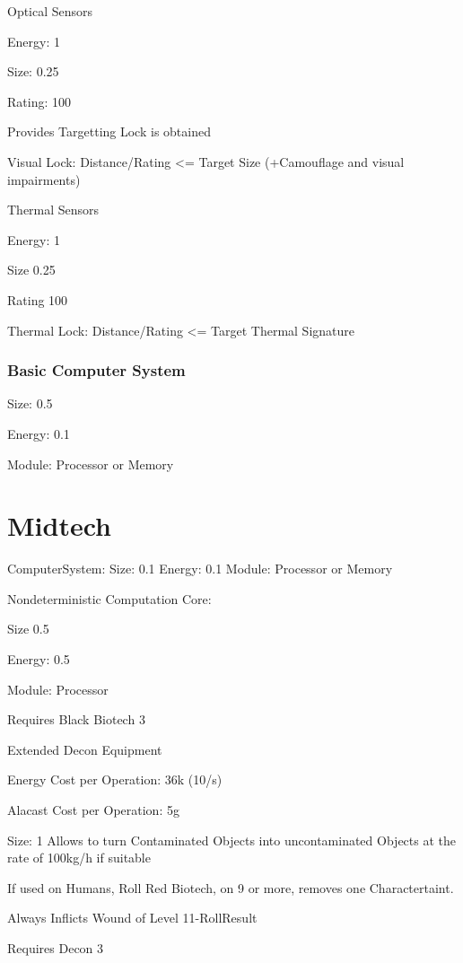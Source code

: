 Optical Sensors\par
Energy: 1\par
Size: 0.25 \par
Rating: 100\par
Provides Targetting Lock is obtained\par
Visual Lock: Distance/Rating <= Target Size (+Camouflage and visual impairments)\par

Thermal Sensors\par
Energy: 1\par
Size 0.25\par
Rating 100\par
Thermal Lock: Distance/Rating <= Target Thermal Signature\par

\subsubsection{Basic Computer System}\par
Size: 0.5\par
Energy: 0.1\par
Module: Processor or Memory\par
\par
\section{Midtech}\label{sec:midtech}
ComputerSystem:
Size: 0.1
Energy: 0.1
Module: Processor or Memory\par

Nondeterministic Computation Core:\par
Size 0.5\par
Energy: 0.5\par
Module: Processor\par
Requires Black Biotech 3\par

Extended Decon Equipment\par
Energy Cost per Operation: 36k (10/s)\par
Alacast Cost per Operation: 5g\par
Size: 1
Allows to turn Contaminated Objects into uncontaminated Objects at the rate of 100kg/h if suitable\par
If used on Humans, Roll Red Biotech, on 9 or more, removes one Charactertaint.\par
Always Inflicts Wound of Level 11-RollResult\par
Requires Decon 3\par

